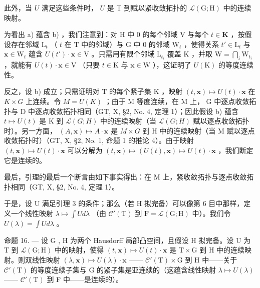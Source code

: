 此外，当 \(U\) 满足这些条件时， \(U\) 是 \(\mathrm{T}\) 到赋以紧收敛拓扑的 \(\mathcal{L}(\mathrm{G};\mathrm{H})\) 中的连续映射。

为看出 a) 蕴含 b) ，我们注意到：对 H 中 0 的每个邻域 V 与每个 \(t \in \mathbf{K}\) ，按假设存在邻域 \(\mathrm{L}_t\) （ \(t\) 在 T 中的邻域）与 G 中 0 的邻域 \(\mathrm{W}_t\) ，使得关系 \(t' \in \mathrm{L}_t\) 与 \(\mathbf{x} \in \mathrm{W}_t\) 蕴含 \(U(t') \cdot \mathbf{x} \in \mathrm{V}\) 。只需用有限个邻域 \(\mathrm{L}_{t_i}\) 覆盖 K ，并取 \(\mathrm{W} = \bigcap_{i} \mathrm{W}_{t_i}\) ，就能有 \(U(t) \cdot \mathbf{x} \in \mathrm{V}\) （只要 \(t \in \mathrm{K}\) 与 \(\mathbf{x} \in \mathrm{W}\) ），这证明了 \(U(\mathrm{K})\) 的等度连续性。

反之，设 b) 成立；只需证明对 T 的每个紧子集 K ，映射 \((t,\mathbf{x})\mapsto U(t)\cdot\mathbf{x}\) 在 \(K\times G\) 上连续。令 \(M=U(K)\) ；由于 M 等度连续，在 M 上， G 中逐点收敛拓扑与 D 中逐点收敛拓扑相同（GT, X, §2, No. 4, 定理 1）；因此假设 b) 蕴含 \(t\mapsto U(t)\) 是 K 到 \(\mathcal{L}(G;H)\) 中的连续映射（当 \(\mathcal{L}(G;H)\) 赋以逐点收敛拓扑时）。另一方面， \((A,\mathbf{x})\mapsto A\cdot\mathbf{x}\) 是 \(M\times G\) 到 H 中的连续映射（当 M 赋以逐点收敛拓扑时）（GT, X, §2, No. 1, 命题 1 的推论 4）。由于映射 \((t,\mathbf{x})\mapsto U(t)\cdot\mathbf{x}\) 可以分解为 \((t,\mathbf{x})\mapsto(U(t),\mathbf{x})\mapsto U(t)\cdot\mathbf{x}\) ，我们断定它是连续的。

最后，引理的最后一个断言由如下事实得出：在 M 上，紧收敛拓扑与逐点收敛拓扑相同（GT, X, §2, No. 4, 定理 1）。

于是，设 U 满足引理 3 的条件；那么（若 H 拟完备）可以像第 6 目中那样，定义一个线性映射 \(\lambda \mapsto \int U d\lambda\) （由 \(\mathcal{C}'(\mathrm{T})\) 到 \(\mathrm{F} = \mathcal{L}(\mathrm{G}; \mathrm{H})\) 中）。我们令 \(U(\lambda) = \int U d\lambda\) 。

命题 16. --- 设 G , H 为两个 Hausdorff 局部凸空间，且假设 H 拟完备。设 U 为 T 到 \(\mathcal{L}(\mathrm{G};\mathrm{H})\) 中的映射，使得 \((t,\mathbf{x})\mapsto U(t)\cdot \mathbf{x}\) 是 \(\mathrm{T}\times \mathrm{G}\) 到 H 中的连续映射。则双线性映射 \((\lambda ,\mathbf{x})\mapsto U(\lambda)\cdot \mathbf{x}\) —— \(\mathcal{C}'(\mathrm{T})\times \mathrm{G}\) 到 H 中——关于 \(\mathcal{C}'(\mathrm{T})\) 的等度连续子集与 G 的紧子集是亚连续的（这蕴含线性映射 \(\lambda \mapsto U(\lambda)\) —— \(\mathcal{C}'(\mathrm{T})\) 到 F 中——是连续的）。

